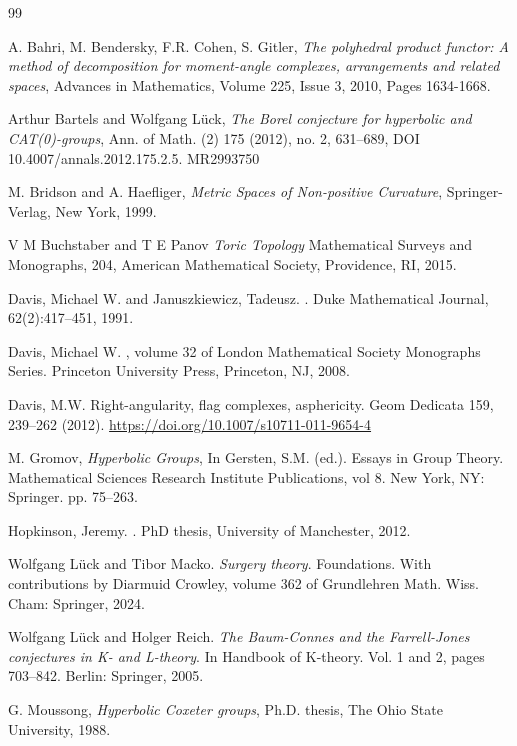 \documentclass[11pt,a4paper]{article}
\numberwithin{equation}{section}
\theoremstyle{named}
\begin{document}
\begin{thebibliography}{99}

A. Bahri, M. Bendersky, F.R. Cohen, S. Gitler, \emph{The polyhedral product functor: A method of decomposition for moment-angle complexes, arrangements and related spaces}, Advances in Mathematics, Volume 225, Issue 3, 2010, Pages 1634-1668.

Arthur Bartels and Wolfgang L\"uck, \emph{The Borel conjecture for hyperbolic and CAT(0)-groups}, Ann. of Math. (2) 175 (2012), no. 2, 631–689, DOI 10.4007/annals.2012.175.2.5. MR2993750

M. Bridson and A. Haefliger, \emph{Metric Spaces of Non-positive Curvature}, Springer-Verlag, New York, 1999.

V M Buchstaber and T E Panov {\em Toric Topology} Mathematical Surveys and Monographs, 204, American Mathematical Society, Providence, RI, 2015.

Davis, Michael W. and Januszkiewicz, Tadeusz.
.
\newblock Duke Mathematical Journal, 62(2):417--451, 1991.


Davis, Michael W.
, volume 32 of London Mathematical Society Monographs Series.
\newblock Princeton University Press, Princeton, NJ, 2008.

Davis, M.W. Right-angularity, flag complexes, asphericity. Geom Dedicata 159, 239–262 (2012). \url{https://doi.org/10.1007/s10711-011-9654-4}

M. Gromov, \emph{Hyperbolic Groups}, In Gersten, S.M. (ed.). Essays in Group Theory. Mathematical Sciences Research Institute Publications, vol 8. New York, NY: Springer. pp. 75–263.

Hopkinson, Jeremy.
.
\newblock PhD thesis, University of Manchester, 2012.

Wolfgang L\"uck and Tibor Macko. \emph{Surgery theory}. Foundations. With contributions by Diarmuid Crowley, volume 362 of Grundlehren Math. Wiss. Cham: Springer, 2024.

Wolfgang L\"uck and Holger Reich. \emph{The Baum-Connes and the Farrell-Jones conjectures in K- and L-theory}. In Handbook of K-theory. Vol. 1 and 2, pages 703–842. Berlin: Springer, 2005.

G. Moussong, \emph{Hyperbolic Coxeter groups}, Ph.D. thesis, The Ohio State University, 1988.


\end{thebibliography}
\end{document}
